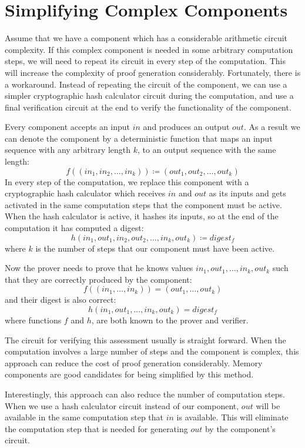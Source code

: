 \pagebreak


\section{Simplifying Complex Components}\label{sec:simplifying-complex-components}

Assume that we have a component which has a considerable arithmetic circuit complexity. If this complex component
is needed in some arbitrary computation steps, we will need to repeat its circuit in every step of the computation. This
will increase the complexity of proof generation considerably. Fortunately, there is a workaround. Instead of
repeating the circuit of the component, we can use a simpler cryptographic hash calculator circuit during the
computation, and use a final verification circuit at the end to verify the functionality of the component.

Every component accepts an input $in$ and produces an output $out$. As a result we can denote the component by a
deterministic function that maps an input sequence with any arbitrary length $k$, to an output sequence with the same
length:
\[
    f((in_1,in_2,\dots,in_k)) \coloneqq (out_1,out_2,\dots,out_k)
\]
In every step of the computation, we replace this component with a cryptographic hash calculator which receives $in$ and
$out$ as its inputs and gets activated in the same computation steps that the component must be active. When the
hash calculator is active, it hashes its inputs, so at the end of the computation it has computed a digest:
\[
    h(in_1,out_1,in_2,out_2,\dots,in_k,out_k) \coloneqq digest_f
\]
where $k$ is the number of steps that our component must have been active.

Now the prover needs to prove that he knows values $in_1,out_1,\dots,in_k,out_k$ such that they are correctly
produced by the component:
\[
    f((in_1,\dots,in_k)) = (out_1,\dots,out_k)
\]
and their digest is also correct:
\[
    h(in_1,out_1,\dots,in_k,out_k) = digest_f
\]
where functions $f$ and $h$, are both known to the prover and verifier.

The circuit for verifying this assessment usually is straight forward. When the computation involves a large
number of steps and the component is complex, this approach can reduce the cost of proof generation considerably. Memory
components are good candidates for being simplified by this method.

Interestingly, this approach can also reduce the number of computation steps. When we use a hash calculator circuit
instead of our component, $out$ will be available in the same computation step that $in$ is available. This will
eliminate the computation step that is needed for generating $out$ by the component's circuit.
%
